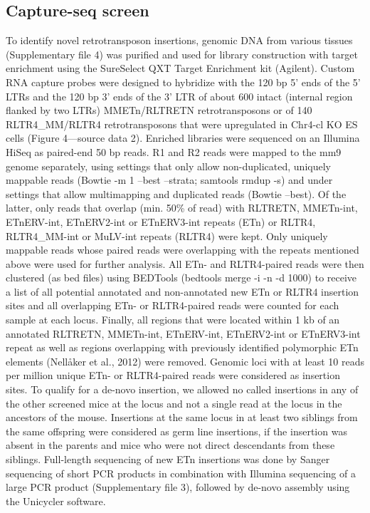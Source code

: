 \documentclass[11pt,a4paper]{article}
\begin{document}
\subsection{Capture-seq screen}

To identify novel retrotransposon insertions, genomic DNA from various tissues (Supplementary file 4) was purified and used for library construction with target enrichment using the SureSelect QXT Target Enrichment kit (Agilent). Custom RNA capture probes were designed to hybridize with the 120 bp 5’ ends of the 5’ LTRs and the 120 bp 3’ ends of the 3’ LTR of about 600 intact (internal region flanked by two LTRs) MMETn/RLTRETN retrotransposons or of 140 RLTR4\_MM/RLTR4 retrotransposons that were upregulated in Chr4-cl KO ES cells (Figure 4—source data 2). Enriched libraries were sequenced on an Illumina HiSeq as paired-end 50 bp reads. R1 and R2 reads were mapped to the mm9 genome separately, using settings that only allow non-duplicated, uniquely mappable reads (Bowtie -m 1 --best --strata; samtools rmdup -s) and under settings that allow multimapping and duplicated reads (Bowtie --best). Of the latter, only reads that overlap (min. 50\% of read) with RLTRETN, MMETn-int, ETnERV-int, ETnERV2-int or ETnERV3-int repeats (ETn) or RLTR4, RLTR4\_MM-int or MuLV-int repeats (RLTR4) were kept. Only uniquely mappable reads whose paired reads were overlapping with the repeats mentioned above were used for further analysis. All ETn- and RLTR4-paired reads were then clustered (as bed files) using BEDTools (bedtools merge -i -n -d 1000) to receive a list of all potential annotated and non-annotated new ETn or RLTR4 insertion sites and all overlapping ETn- or RLTR4-paired reads were counted for each sample at each locus. Finally, all regions that were located within 1 kb of an annotated RLTRETN, MMETn-int, ETnERV-int, ETnERV2-int or ETnERV3-int repeat as well as regions overlapping with previously identified polymorphic ETn elements (Nellåker et al., 2012) were removed. Genomic loci with at least 10 reads per million unique ETn- or RLTR4-paired reads were considered as insertion sites. To qualify for a de-novo insertion, we allowed no called insertions in any of the other screened mice at the locus and not a single read at the locus in the ancestors of the mouse. Insertions at the same locus in at least two siblings from the same offspring were considered as germ line insertions, if the insertion was absent in the parents and mice who were not direct descendants from these siblings. Full-length sequencing of new ETn insertions was done by Sanger sequencing of short PCR products in combination with Illumina sequencing of a large PCR product (Supplementary file 3), followed by de-novo assembly using the Unicycler software.
\end{document}
